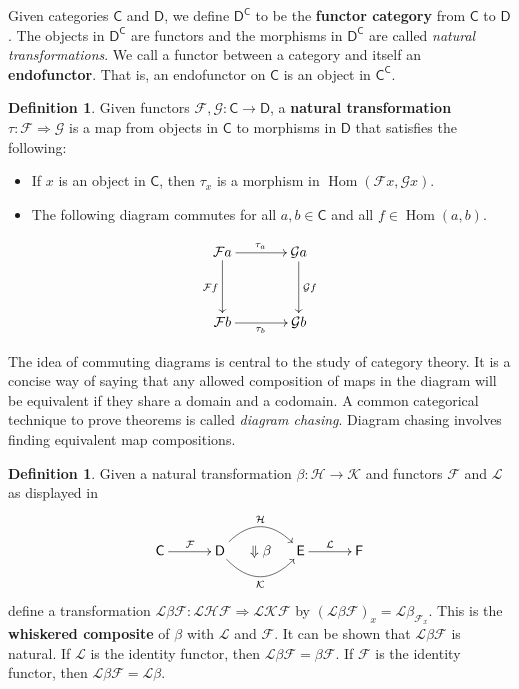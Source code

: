 \documentclass[MS, xcolor=dvipsnames]{wfuthesis}
\def\sC{\mathsf{C}}
\def\sD{\mathsf{D}}
\def\cF{\mathcal{F}}
\def\cG{\mathcal{G}}
\DeclareMathOperator{\Hom}{Hom}
\theoremstyle{definition}
\newtheorem{definition}[theorem]{Definition}
\begin{document}
Given categories $\sC$ and $\sD$, we define $\sD^\sC$ to be the \textbf{functor category} from $\sC$ to $\sD$. The objects in $\sD^\sC$ are functors and the morphisms in $\sD^\sC$ are called \emph{natural transformations}. We call a functor between a category and itself an \textbf{endofunctor}. That is, an endofunctor on $\sC$ is an object in $\sC^\sC$. 
\begin{definition}
  Given functors $\cF, \cG: \sC \to \sD$, a \textbf{natural transformation} $\tau: \cF \Rightarrow \cG$ is a map from objects in $\sC$ to morphisms in $\sD$ that satisfies the following:
  \begin{itemize}
    \item If $x$ is an object in $\sC$, then $\tau_x$ is a morphism in $\Hom(\cF x, \cG x)$. 
    \item The following diagram commutes for all $a,b \in \sC$ and all $f \in \Hom(a,b)$. 
  \end{itemize}
  \[ \SelectTips{cm}{}\xymatrix@R+1pc@C+1pc{
      \cF a \ar[r]^{\tau_a} \ar[d]_{\cF f} & \cG a \ar[d]^{\cG f} \\ \cF b \ar[r]_{\tau_b} & \cG b
  } \]
\end{definition}
The idea of commuting diagrams is central to the study of category theory. It is a concise way of saying that any allowed composition of maps in the diagram will be equivalent if they share a domain and a codomain. A common categorical technique to prove theorems is called \emph{diagram chasing}. Diagram chasing involves finding equivalent map compositions. \par
\begin{definition}
  Given a natural transformation $\beta: \mathcal H \to \mathcal K$ and functors $\mathcal F$ and $\mathcal L$ as displayed in 
  \[ \SelectTips{cm}{}\xymatrix@C-1pc{
    \sC \ar[0,2]^{\cF} & & \sD \ar@/^1.5pc/[0,2]^{\mathcal H} \ar@/_1.5pc/[0,2]_{\mathcal K} & \Downarrow\beta & \mathsf E \ar[0,2]^{\mathcal L} & & \mathsf F
  } \]
  define a transformation $\mathcal L \beta \mathcal F: \mathcal L \mathcal H \mathcal F \Rightarrow \mathcal L \mathcal K \mathcal F$ by $(\mathcal L \beta \mathcal F)_x = \mathcal L \beta_{\mathcal F_x}$. This is the \textbf{whiskered composite} of $\beta$ with $\mathcal L$ and $\mathcal F$. It can be shown that $\mathcal L \beta \mathcal F$ is natural. If $\mathcal L$ is the identity functor, then $\mathcal L \beta \mathcal F = \beta \mathcal F$. If $\mathcal F$ is the identity functor, then  $\mathcal L \beta \mathcal F = \mathcal L \beta$. 
\end{definition}
\end{document}
